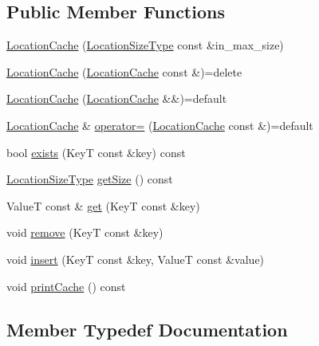 \subsection*{Public Member Functions}
\begin{DoxyCompactItemize}
\item 
\hyperlink{structvt_1_1location_1_1_location_cache_a5a43f6d320c5b23dbb819e9bc74deeeb}{Location\+Cache} (\hyperlink{namespacevt_1_1location_ab1c4c5849012a23eee2fbd1fce6159d7}{Location\+Size\+Type} const \&in\+\_\+max\+\_\+size)
\item 
\hyperlink{structvt_1_1location_1_1_location_cache_a577179b586e3aa1a3d2b3c5dd6a10229}{Location\+Cache} (\hyperlink{structvt_1_1location_1_1_location_cache}{Location\+Cache} const \&)=delete
\item 
\hyperlink{structvt_1_1location_1_1_location_cache_ab6e98f027816ca0bc92d442b63160900}{Location\+Cache} (\hyperlink{structvt_1_1location_1_1_location_cache}{Location\+Cache} \&\&)=default
\item 
\hyperlink{structvt_1_1location_1_1_location_cache}{Location\+Cache} \& \hyperlink{structvt_1_1location_1_1_location_cache_a31d50fe03fe4686019333d1166d52769}{operator=} (\hyperlink{structvt_1_1location_1_1_location_cache}{Location\+Cache} const \&)=default
\item 
bool \hyperlink{structvt_1_1location_1_1_location_cache_a2e2f1c3ef1611782da77635c4181eae4}{exists} (KeyT const \&key) const
\item 
\hyperlink{namespacevt_1_1location_ab1c4c5849012a23eee2fbd1fce6159d7}{Location\+Size\+Type} \hyperlink{structvt_1_1location_1_1_location_cache_ae33d5f17b36da8b414041af55fbfac2a}{get\+Size} () const
\item 
ValueT const  \& \hyperlink{structvt_1_1location_1_1_location_cache_afb4dcce28f172b1e16567025453f22d9}{get} (KeyT const \&key)
\item 
void \hyperlink{structvt_1_1location_1_1_location_cache_ac39441e200c3c3023bda193f7075f372}{remove} (KeyT const \&key)
\item 
void \hyperlink{structvt_1_1location_1_1_location_cache_a62020ee4735da790dd652f1cfcf2583d}{insert} (KeyT const \&key, ValueT const \&value)
\item 
void \hyperlink{structvt_1_1location_1_1_location_cache_a0c8f06fd5c1ff26c30c0c25b5800ba30}{print\+Cache} () const
\end{DoxyCompactItemize}


\subsection{Member Typedef Documentation}
\mbox{\label{structvt_1_1location_1_1_location_cache_aee11ea8af838d172e1834a9d0293b28d}} 
